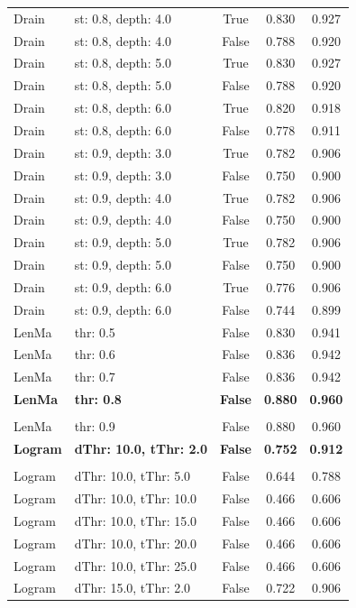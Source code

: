 \begin{small}
\begin{longtable}{llccc}
Drain & st: 0.8, depth: 4.0 & True & 0.830 & 0.927 \\
Drain & st: 0.8, depth: 4.0 & False & 0.788 & 0.920 \\
Drain & st: 0.8, depth: 5.0 & True & 0.830 & 0.927 \\
Drain & st: 0.8, depth: 5.0 & False & 0.788 & 0.920 \\
Drain & st: 0.8, depth: 6.0 & True & 0.820 & 0.918 \\
Drain & st: 0.8, depth: 6.0 & False & 0.778 & 0.911 \\
Drain & st: 0.9, depth: 3.0 & True & 0.782 & 0.906 \\
Drain & st: 0.9, depth: 3.0 & False & 0.750 & 0.900 \\
Drain & st: 0.9, depth: 4.0 & True & 0.782 & 0.906 \\
Drain & st: 0.9, depth: 4.0 & False & 0.750 & 0.900 \\
Drain & st: 0.9, depth: 5.0 & True & 0.782 & 0.906 \\
Drain & st: 0.9, depth: 5.0 & False & 0.750 & 0.900 \\
Drain & st: 0.9, depth: 6.0 & True & 0.776 & 0.906 \\
Drain & st: 0.9, depth: 6.0 & False & 0.744 & 0.899 \\
\midrule
LenMa & thr: 0.5 & False & 0.830 & 0.941 \\
LenMa & thr: 0.6 & False & 0.836 & 0.942 \\
LenMa & thr: 0.7 & False & 0.836 & 0.942 \\
\textbf{LenMa} & \textbf{thr: 0.8} & \textbf{False} & \textbf{0.880} & \textbf{0.960} \\\\
LenMa & thr: 0.9 & False & 0.880 & 0.960 \\
\midrule
\textbf{Logram} & \textbf{dThr: 10.0, tThr: 2.0} & \textbf{False} & \textbf{0.752} & \textbf{0.912} \\\\
Logram & dThr: 10.0, tThr: 5.0 & False & 0.644 & 0.788 \\
Logram & dThr: 10.0, tThr: 10.0 & False & 0.466 & 0.606 \\
Logram & dThr: 10.0, tThr: 15.0 & False & 0.466 & 0.606 \\
Logram & dThr: 10.0, tThr: 20.0 & False & 0.466 & 0.606 \\
Logram & dThr: 10.0, tThr: 25.0 & False & 0.466 & 0.606 \\
Logram & dThr: 15.0, tThr: 2.0 & False & 0.722 & 0.906 \\

\end{longtable}
\end{small}
